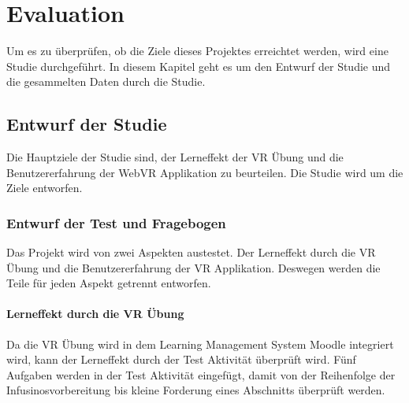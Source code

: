 \chapter{Evaluation}

Um es zu überprüfen, ob die Ziele dieses Projektes erreichtet werden, wird eine Studie durchgeführt. In diesem Kapitel geht es um den Entwurf der Studie und die gesammelten Daten durch die Studie.

\section{Entwurf der Studie}

Die Hauptziele der Studie sind, der Lerneffekt der VR Übung und die Benutzererfahrung der WebVR Applikation zu beurteilen. Die Studie wird um die Ziele entworfen.

\subsection{Entwurf der Test und Fragebogen}

Das Projekt wird von zwei Aspekten austestet. Der Lerneffekt durch die VR Übung und die Benutzererfahrung der VR Applikation. Deswegen werden die Teile für jeden Aspekt getrennt entworfen.

\subsubsection{Lerneffekt durch die VR Übung}

Da die VR Übung wird in dem Learning Management System Moodle integriert wird, kann der Lerneffekt durch der Test Aktivität überprüft wird. Fünf Aufgaben werden in der Test Aktivität eingefügt, damit von der Reihenfolge der Infusinosvorbereitung bis kleine Forderung eines Abschnitts überprüft werden.

